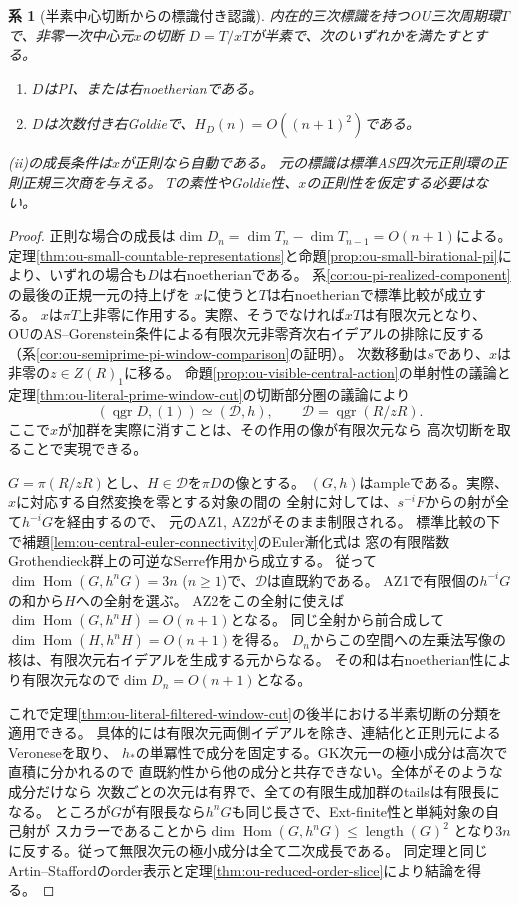 \documentclass[11pt,a4paper]{ltjsarticle}
\newtheorem{corollary}[theorem]{系}
\theoremstyle{definition}
\newcommand{\qgr}{\operatorname{qgr}}
\begin{document}
\begin{corollary}[半素中心切断からの標識付き認識]
\label{cor:ou-literal-semiprime-pi-hypersurface}
内在的三次標識を持つOU三次周期環$T$で、非零一次中心元$x$の切断
$D=T/xT$が半素で、次のいずれかを満たすとする。
\begin{enumerate}[label=(\roman*)]
\item $D$はPI、または右noetherianである。
\item $D$は次数付き右Goldieで、$H_D(n)=O((n+1)^2)$である。
\end{enumerate}
(ii)の成長条件は$x$が正則なら自動である。
元の標識は標準AS四次元正則環の正則正規三次商を与える。
$T$の素性やGoldie性、$x$の正則性を仮定する必要はない。
\end{corollary}
\begin{proof}
正則な場合の成長は$\dim D_n=\dim T_n-\dim T_{n-1}=O(n+1)$による。
定理\ref{thm:ou-small-countable-representations}と命題\ref{prop:ou-small-birational-pi}により、いずれの場合も$D$は右noetherianである。
系\ref{cor:ou-pi-realized-component}の最後の正規一元の持上げを
$x$に使うと$T$は右noetherianで標準比較が成立する。
$x$は$\pi T$上非零に作用する。実際、そうでなければ$xT$は有限次元となり、
OUのAS--Gorenstein条件による有限次元非零斉次右イデアルの排除に反する
（系\ref{cor:ou-semiprime-pi-window-comparison}の証明）。
次数移動は$s$であり、$x$は非零の$z\in Z(R)_1$に移る。
命題\ref{prop:ou-visible-central-action}の単射性の議論と
定理\ref{thm:ou-literal-prime-window-cut}の切断部分圏の議論により
\[
  (\qgr D,(1))\simeq(\mathcal D,h),\qquad
  \mathcal D=\qgr(R/zR).
\]
ここで$x$が加群を実際に消すことは、その作用の像が有限次元なら
高次切断を取ることで実現できる。

$G=\pi(R/zR)$とし、$H\in\mathcal D$を$\pi D$の像とする。
$(G,h)$はampleである。実際、$x$に対応する自然変換を零とする対象の間の
全射に対しては、$s^{-i}F$からの射が全て$h^{-i}G$を経由するので、
元のAZ1, AZ2がそのまま制限される。
標準比較の下で補題\ref{lem:ou-central-euler-connectivity}のEuler漸化式は
窓の有限階数Grothendieck群上の可逆なSerre作用から成立する。
従って$\dim\operatorname{Hom}(G,h^nG)=3n$ ($n\ge1$)で、$\mathcal D$は直既約である。
AZ1で有限個の$h^{-i}G$の和から$H$への全射を選ぶ。
AZ2をこの全射に使えば$\dim\operatorname{Hom}(G,h^nH)=O(n+1)$となる。
同じ全射から前合成して$\dim\operatorname{Hom}(H,h^nH)=O(n+1)$を得る。
$D_n$からこの空間への左乗法写像の核は、有限次元右イデアルを生成する元からなる。
その和は右noetherian性により有限次元なので$\dim D_n=O(n+1)$となる。

これで定理\ref{thm:ou-literal-filtered-window-cut}の後半における半素切断の分類を適用できる。
具体的には有限次元両側イデアルを除き、連結化と正則元によるVeroneseを取り、
$h_*$の単冪性で成分を固定する。GK次元一の極小成分は高次で直積に分かれるので
直既約性から他の成分と共存できない。全体がそのような成分だけなら
次数ごとの次元は有界で、全ての有限生成加群のtailsは有限長になる。
ところが$G$が有限長なら$h^nG$も同じ長さで、Ext-finite性と単純対象の自己射が
スカラーであることから$\dim\operatorname{Hom}(G,h^nG)\le\operatorname{length}(G)^2$
となり$3n$に反する。従って無限次元の極小成分は全て二次成長である。
同定理と同じArtin--Staffordのorder表示と定理\ref{thm:ou-reduced-order-slice}により結論を得る。
\end{proof}
\end{document}
